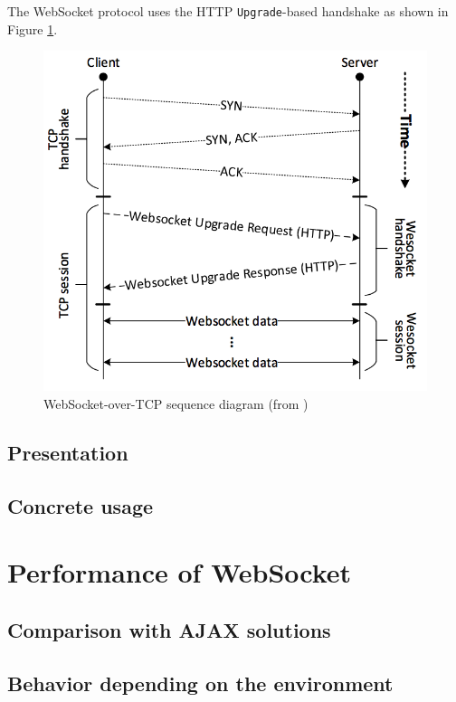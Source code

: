 \documentclass[journal,compsoc]{IEEEtran}
\newcommand{\ttt}[1]{\texttt{#1}}
\newcommand{\ws}{WebSocket}
\begin{document}
The \ws{} protocol uses the HTTP \ttt{Upgrade}-based handshake as shown in Figure \ref{fig:websocket_connection}.

\begin{figure}
    \centering
    \label{fig:websocket_connection}
    \includegraphics[width=\linewidth]{websocket_tcp_diagram.png}
    \caption{\ws-over-TCP sequence diagram (from \cite{performanceEvaluationOfWebsocketProtocol})}
\end{figure}


\subsection{Presentation}

\subsection{Concrete usage}



\section{Performance of \ws}

\subsection{Comparison with AJAX solutions}

\subsection{Behavior depending on the environment}
\end{document}
